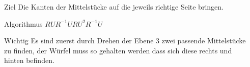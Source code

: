 \begin{frame}
\begin{columns}[c]
\begin{column}[C]{.5\textwidth}
		\end{column}
		\begin{column}[C]{.5\textwidth}
			\begin{block}{Ziel}
				Die Kanten der Mittelstücke auf die jeweils richtige Seite bringen.
			\end{block}
			\begin{exampleblock}{Algorithmus}
				$RUR^{-1}URU^2R^{-1}U$
			\end{exampleblock}
			\begin{alertblock}{Wichtig}
				Es sind zuerst durch Drehen der Ebene 3 zwei passende Mittelstücke zu finden, der Würfel muss so gehalten werden dass sich diese rechts und hinten befinden.
			\end{alertblock}
		\end{column}
	\end{columns}
	
\end{frame}

